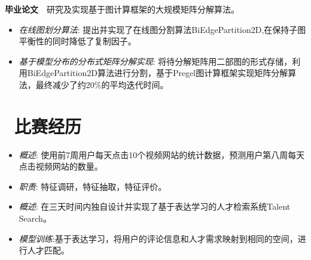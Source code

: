 \documentclass[10pt,a4paper]{resume}
\begin{document}
\begin{onehalfspacing}
\textbf{毕业论文}\ \ 研究及实现基于图计算框架的大规模矩阵分解算法。
\begin{itemize}
  \item {\emph{在线图划分算法}}: 提出并实现了在线图分割算法BiEdgePartition2D,在保持子图平衡性的同时降低了复制因子。
  \item {\emph{基于模型分布的分布式矩阵分解实现}}: 将待分解矩阵用二部图的形式存储，利用BiEdgePartition2D算法进行分割，基于Pregel图计算框架实现矩阵分解算法，最终减少了约20\%的平均迭代时间。
\end{itemize}
\end{onehalfspacing}

\section{\faUsers\ 比赛经历}
\begin{onehalfspacing}
\begin{itemize}
\item {\emph{概述}}: 使用前7周用户每天点击10个视频网站的统计数据，预测用户第八周每天点击视频网站的数量。
\item {\emph{职责}}: 特征调研，特征抽取，特征评价。
\end{itemize}
\end{onehalfspacing}

\begin{onehalfspacing}
\begin{itemize}
\item {\emph{概述}}: 在三天时间内独自设计并实现了基于表达学习的人才检索系统Talent Search。
  \item {\emph{模型训练}}:基于表达学习，将用户的评论信息和人才需求映射到相同的空间，进行人才匹配。
\end{itemize}
\end{onehalfspacing}
\end{document}
